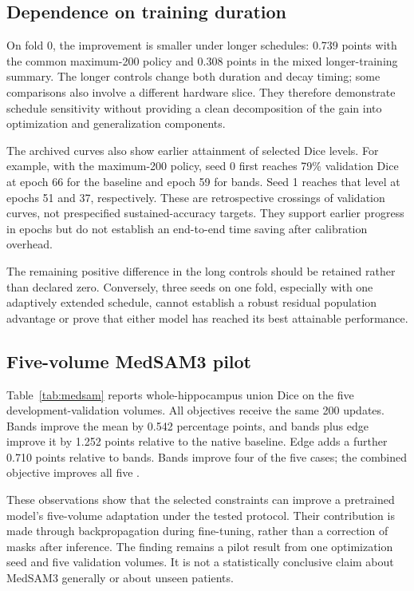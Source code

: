 \subsection{Dependence on training duration}
On fold 0, the improvement is smaller under longer schedules: 0.739 points with the common maximum-200 policy and 0.308 points in the mixed longer-training summary. The longer controls change both duration and decay timing; some comparisons also involve a different hardware slice. They therefore demonstrate schedule sensitivity without providing a clean decomposition of the gain into optimization and generalization components.

The archived curves also show earlier attainment of selected Dice levels. For example, with the maximum-200 policy, seed 0 first reaches 79\% validation Dice at epoch 66 for the baseline and epoch 59 for bands. Seed 1 reaches that level at epochs 51 and 37, respectively. These are retrospective crossings of validation curves, not prespecified sustained-accuracy targets. They support earlier progress in epochs but do not establish an end-to-end time saving after calibration overhead.

The remaining positive difference in the long controls should be retained rather than declared zero. Conversely, three seeds on one fold, especially with one adaptively extended schedule, cannot establish a robust residual population advantage or prove that either model has reached its best attainable performance.

\subsection{Five-volume MedSAM3 pilot}
Table~\ref{tab:medsam} reports whole-hippocampus union Dice on the five development-validation volumes. All objectives receive the same 200 updates. Bands improve the mean by 0.542 percentage points, and bands plus edge improve it by 1.252 points relative to the native baseline. Edge adds a further 0.710 points relative to bands. Bands improve four of the five cases; the combined objective improves all five \cite{localMedSAMpilot}.



These observations show that the selected constraints can improve a pretrained model's five-volume adaptation under the tested protocol. Their contribution is made through backpropagation during fine-tuning, rather than a correction of masks after inference. The finding remains a pilot result from one optimization seed and five validation volumes. It is not a statistically conclusive claim about MedSAM3 generally or about unseen patients.

